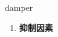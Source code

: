 
\begin{frame}
{\huge damper}
\begin{center}
\begin{enumerate}\Large
  \item \textbf{抑制因素}
\end{enumerate}
\end{center}
\end{frame}
